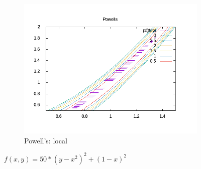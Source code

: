 \documentclass[12pt,letterpaper]{article}
\begin{document}
\begin{enumerate}
\begin{figure}
\begin{subfigure}[b]{0.29\textwidth}
    \includegraphics[width=\textwidth]{figures/Powells_1_2.png}
    \caption{Powell's: local }
  \end{subfigure}
    \caption{$f(x, y)=50*(y-x^2)^2 + (1-x)^2$}
\end{figure}


\end{enumerate}
\end{document}
